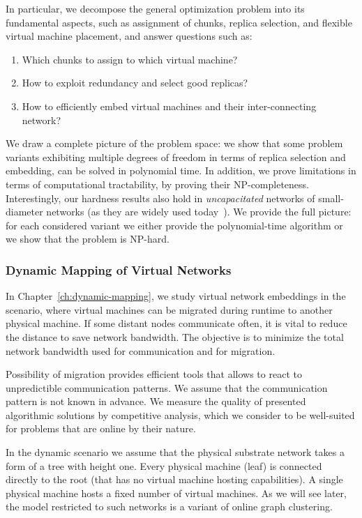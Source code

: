 In particular, we decompose the general optimization problem into its fundamental aspects, such as
assignment of chunks, replica selection, and flexible virtual machine
placement, and answer questions such as:
\begin{enumerate}
\item Which chunks to assign to which virtual machine?

\item How to exploit redundancy and select good replicas?

\item How to efficiently embed virtual machines and their inter-connecting network?

\end{enumerate}

We draw a complete picture of the problem space: we show that
some problem variants exhibiting multiple degrees of freedom in terms of
replica selection and embedding,
can be solved in polynomial time. In addition, we prove limitations in terms of
computational tractability, by proving their NP-completeness. Interestingly,
our hardness results also hold in \emph{uncapacitated}
networks of small-diameter networks (as they are
widely used today~\cite{fattree}).
We provide the full picture: for each considered variant we either provide the polynomial-time algorithm or we show that the problem is NP-hard.


\subsubsection{Dynamic Mapping of Virtual Networks}
\label{sec:contributions-dynamic-mapping}

In Chapter~\ref{ch:dynamic-mapping}, we study virtual network embeddings in the scenario, where virtual machines can be migrated during runtime to another physical machine.
If some distant nodes communicate often, it is vital to reduce the distance to save network bandwidth.
The objective is to minimize the total network bandwidth used for communication and for migration.

Possibility of migration provides efficient tools that allows to react to unpredictible communication patterns.
We assume that the communication pattern is not known in advance.
We measure the quality of presented algorithmic solutions by competitive analysis, which we consider to be well-suited for problems that are online by their nature.

In the dynamic scenario we assume that the physical substrate network takes a form of a tree with height one.
Every physical machine (leaf) is connected directly to the root (that has no virtual machine hosting capabilities).
A single physical machine hosts a fixed number of virtual machines.
As we will see later, the model restricted to such networks is a variant of online graph clustering.


